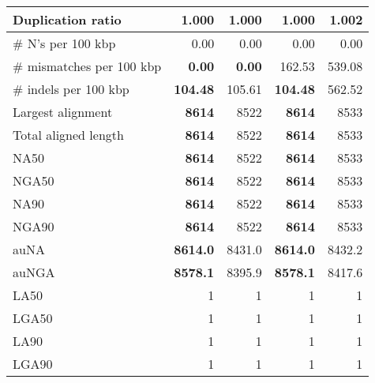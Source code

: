 \documentclass[12pt,a4paper]{article}
\begin{document}
\begin{table}[ht]
\begin{center}
\begin{tabular}{|l*{4}{|r}|}
Duplication ratio & {\bf 1.000} & {\bf 1.000} & {\bf 1.000} & 1.002 \\ \hline
\# N's per 100 kbp & 0.00 & 0.00 & 0.00 & 0.00 \\ \hline
\# mismatches per 100 kbp & {\bf 0.00} & {\bf 0.00} & 162.53 & 539.08 \\ \hline
\# indels per 100 kbp & {\bf 104.48} & 105.61 & {\bf 104.48} & 562.52 \\ \hline
Largest alignment & {\bf 8614} & 8522 & {\bf 8614} & 8533 \\ \hline
Total aligned length & {\bf 8614} & 8522 & {\bf 8614} & 8533 \\ \hline
NA50 & {\bf 8614} & 8522 & {\bf 8614} & 8533 \\ \hline
NGA50 & {\bf 8614} & 8522 & {\bf 8614} & 8533 \\ \hline
NA90 & {\bf 8614} & 8522 & {\bf 8614} & 8533 \\ \hline
NGA90 & {\bf 8614} & 8522 & {\bf 8614} & 8533 \\ \hline
auNA & {\bf 8614.0} & 8431.0 & {\bf 8614.0} & 8432.2 \\ \hline
auNGA & {\bf 8578.1} & 8395.9 & {\bf 8578.1} & 8417.6 \\ \hline
LA50 & 1 & 1 & 1 & 1 \\ \hline
LGA50 & 1 & 1 & 1 & 1 \\ \hline
LA90 & 1 & 1 & 1 & 1 \\ \hline
LGA90 & 1 & 1 & 1 & 1 \\ \hline
\end{tabular}
\end{center}
\end{table}
\end{document}
